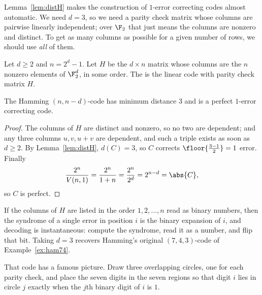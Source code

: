 Lemma~\ref{lem:distH} makes the construction of $1$-error correcting codes almost automatic. We need $d = 3$, so we need a parity check matrix whose columns are pairwise linearly independent; over $\F_2$ that just means the columns are nonzero and distinct. To get as many columns as possible for a given number of rows, we should use \emph{all} of them.

\begin{definition}
	Let $d \ge 2$ and $n = 2^d - 1$. Let $H$ be the $d\times n$ matrix whose columns are the $n$ nonzero elements of $\F_2^d$, in some order. The  is the linear code with parity check matrix $H$.
\end{definition}

\begin{lemma}
	The Hamming $(n,n-d)$-code has minimum distance $3$ and is a perfect $1$-error correcting code.
\end{lemma}

\begin{proof}
	The columns of $H$ are distinct and nonzero, so no two are dependent; and any three columns $u,v,u+v$ are dependent, and such a triple exists as soon as $d \ge 2$. By Lemma~\ref{lem:distH}, $d(C) = 3$, so $C$ corrects $\floor{\frac{3-1}{2}} = 1$ error. Finally
	$$\frac{2^n}{V(n,1)} = \frac{2^n}{1+n} = \frac{2^n}{2^d} = 2^{n-d} = \abs{C},$$
	so $C$ is perfect.
\end{proof}

If the columns of $H$ are listed in the order $1, 2, \dots, n$ read as binary numbers, then the syndrome of a single error in position $i$ is the binary expansion of $i$, and decoding is instantaneous: compute the syndrome, read it as a number, and flip that bit. Taking $d = 3$ recovers Hamming's original $(7,4,3)$-code of Example~\ref{ex:ham74}.

That code has a famous picture. Draw three overlapping circles, one for each parity check, and place the seven digits in the seven regions so that digit $i$ lies in circle $j$ exactly when the $j$th binary digit of $i$ is $1$.

\begin{center}
\end{center}

